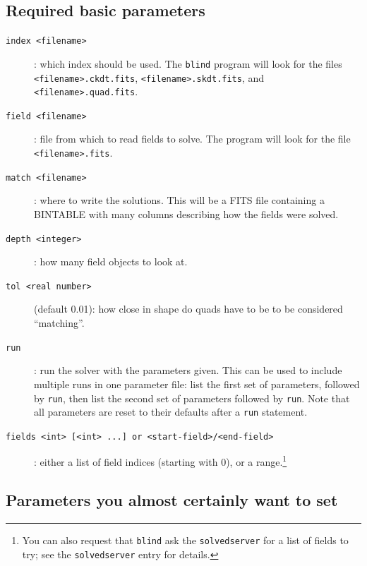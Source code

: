\documentclass[12pt,letterpaper,titlepage]{article}
\newcommand{\code}[1]{\texttt{#1}}
\begin{document}
\subsection{Required basic parameters}
\begin{description}
\item[\code{index <filename>}]: which index should be used.  The
  \code{blind} program will look for the files \code{<filename>.ckdt.fits},
  \code{<filename>.skdt.fits}, and \code{<filename>.quad.fits}.
\item[\code{field <filename>}]: file from which to read fields to solve.
  The program will look for the file \code{<filename>.fits}.
\item[\code{match <filename>}]: where to write the solutions.  This will be
  a FITS file containing a BINTABLE with many columns describing how the
  fields were solved.
\item[\code{depth <integer>}]: how many field objects to look at.
\item[\code{tol <real number>}] (default 0.01): how close in shape do quads
  have to be to be considered ``matching''.
\item[\code{run}]: run the solver with the parameters given.  This can be
  used to include multiple runs in one parameter file: list the first set
  of parameters, followed by \code{run}, then list the second set of
  parameters followed by \code{run}.  Note that all parameters are reset
  to their defaults after a \code{run} statement.
\item[\code{fields <int> [<int> ...] or <start-field>/<end-field>}]:
  either a list of field indices (starting with 0), or a range.\footnote{%
	You can also request that \code{blind} ask the \code{solvedserver} for a
	list of fields to try; see the \code{solvedserver} entry for details.}
\end{description}

\subsection{Parameters you almost certainly want to set}
\end{document}
